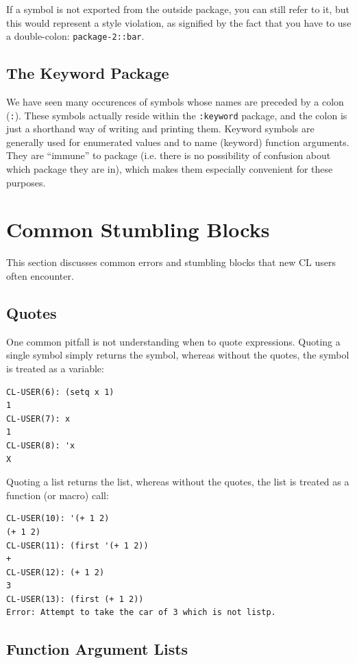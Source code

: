 If a symbol is not exported from the outside package, you can still refer to it, but this
would represent a style violation, as signified by the fact that you have to use a double-colon:
\texttt{package-2::bar}.

\subsection{The Keyword Package}

We have seen many occurences of symbols whose names are preceded by a colon (\texttt{:}). These
symbols actually reside within the \texttt{:keyword} package, and the colon is just a shorthand way
of writing and printing them. Keyword symbols are generally used for enumerated values
and to name (keyword) function arguments. They are ``immune'' to package (i.e. there is
no possibility of confusion about which package they are in), which makes them especially
convenient for these purposes.

\section{Common Stumbling Blocks}

This section discusses common errors and stumbling blocks that new CL users often encounter.

\subsection{Quotes}

One common pitfall is not understanding when to quote expressions. Quoting a single
symbol simply returns the symbol, whereas without the quotes, the symbol is treated as a
variable:

\begin{verbatim}
CL-USER(6): (setq x 1)
1
CL-USER(7): x
1
CL-USER(8): 'x
X
\end{verbatim}

Quoting a list returns the list, whereas without the quotes, the list is treated as a function
(or macro) call:

\begin{verbatim}
CL-USER(10): '(+ 1 2)
(+ 1 2)
CL-USER(11): (first '(+ 1 2))
+
CL-USER(12): (+ 1 2)
3
CL-USER(13): (first (+ 1 2))
Error: Attempt to take the car of 3 which is not listp.
\end{verbatim}

\subsection{Function Argument Lists}

